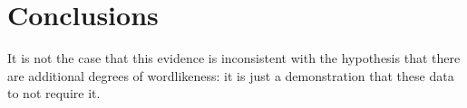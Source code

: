 \section{Conclusions}

It is not the case that this evidence is inconsistent with the hypothesis that there are additional degrees of wordlikeness: it is just a demonstration that these data to not require it. 

